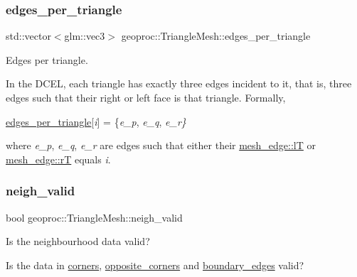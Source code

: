 \subsubsection{\texorpdfstring{edges\+\_\+per\+\_\+triangle}{edges\_per\_triangle}}
{\footnotesize\ttfamily std\+::vector$<$glm\+::vec3$>$ geoproc\+::\+Triangle\+Mesh\+::edges\+\_\+per\+\_\+triangle\hspace{0.3cm}{\ttfamily [protected]}}



Edges per triangle. 

In the D\+C\+EL, each triangle has exactly three edges incident to it, that is, three edges such that their right or left face is that triangle. Formally,

\hyperlink{classgeoproc_1_1TriangleMesh_a3bc5c41f4baeda69a72c5eda4ed3d699}{edges\+\_\+per\+\_\+triangle}\mbox{[}{\itshape i}\mbox{]} = \{{\itshape e\+\_\+p}, {\itshape e\+\_\+q}, {\itshape e\+\_\+r\}} 

where {\itshape e\+\_\+p}, {\itshape e\+\_\+q}, {\itshape e\+\_\+r} are edges such that either their \hyperlink{classgeoproc_1_1mesh__edge_a348d06b420ce1588be1bc7eac781c6ef}{mesh\+\_\+edge\+::lT} or \hyperlink{classgeoproc_1_1mesh__edge_af19f02d3f6c36f2b23afa581c8ae3f59}{mesh\+\_\+edge\+::rT} equals {\itshape i}. \mbox{\label{classgeoproc_1_1TriangleMesh_a21205ec88e494f864db4d8247db70d3c}} 
\subsubsection{\texorpdfstring{neigh\+\_\+valid}{neigh\_valid}}
{\footnotesize\ttfamily bool geoproc\+::\+Triangle\+Mesh\+::neigh\+\_\+valid\hspace{0.3cm}{\ttfamily [protected]}}



Is the neighbourhood data valid? 

Is the data in \hyperlink{classgeoproc_1_1TriangleMesh_ab9610d614e081deb28010d237fecd55b}{corners}, \hyperlink{classgeoproc_1_1TriangleMesh_a2604795c90c694116513252b86d242b4}{opposite\+\_\+corners} and \hyperlink{classgeoproc_1_1TriangleMesh_a142a764ddf07b98c7efcd596d88c3f87}{boundary\+\_\+edges} valid? \mbox{\label{classgeoproc_1_1TriangleMesh_ab9030a0301b2fe5868ad6c08692cce09}} 
